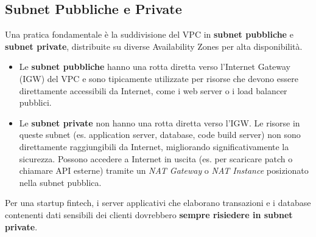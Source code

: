\documentclass[a4paper,12pt]{report}
\begin{document}
\subsection{Subnet Pubbliche e Private}
\label{subsec:subnets}
Una pratica fondamentale è la suddivisione del VPC in \textbf{subnet pubbliche} e \textbf{subnet private}, distribuite su diverse Availability Zones per alta disponibilità.
\begin{itemize}
    \item Le \textbf{subnet pubbliche} hanno una rotta diretta verso l'Internet Gateway (IGW) del VPC e sono tipicamente utilizzate per risorse che devono essere direttamente accessibili da Internet, come i web server o i load balancer pubblici.
    \item Le \textbf{subnet private} non hanno una rotta diretta verso l'IGW. Le risorse in queste subnet (es. application server, database, code build server) non sono direttamente raggiungibili da Internet, migliorando significativamente la sicurezza. Possono accedere a Internet in uscita (es. per scaricare patch o chiamare API esterne) tramite un \textit{NAT Gateway} o \textit{NAT Instance} posizionato nella subnet pubblica.
\end{itemize}
Per una startup fintech, i server applicativi che elaborano transazioni e i database contenenti dati sensibili dei clienti dovrebbero \textbf{sempre risiedere in subnet private}.
\end{document}
